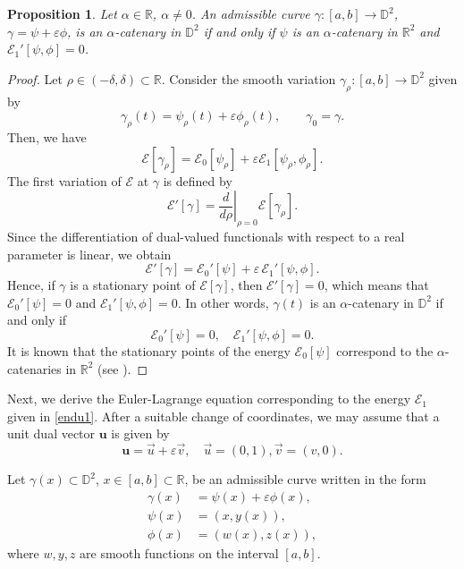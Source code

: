 \documentclass[a4paper,12pt]{amsart}
\newtheorem{proposition}[theorem]{Proposition}
\theoremstyle{definition}
\def\r{\mathbb R}
\def\d{\mathsf d}
\def\d{\mathbb D}
\begin{document}
\begin{proposition}\label{p21}
Let $\alpha\in \r$, $\alpha\neq0$. An admissible curve $\gamma:[a,b]\to\d^2$, $\gamma=\psi+\varepsilon \phi$, is an $\alpha$-catenary in $\d^2$ if and only if $ \psi$ is an $\alpha$-catenary in $\r^2$ and $\mathcal{E}_1'[\psi,\phi]=0$.
\end{proposition}
\begin{proof}
Let $\rho \in (-\delta,\delta)\subset \r$. Consider the smooth variation $\gamma_\rho:[a,b]\to \d^2$ given by
$$
\gamma_\rho(t)=\psi_\rho(t)+\varepsilon \phi_\rho(t), \qquad \gamma_0=\gamma.
$$
Then, we have
$$
\mathcal{E}[\gamma_\rho]
=\mathcal{E}_0[\psi_\rho]+\varepsilon \mathcal{E}_1[\psi_\rho,\phi_\rho].
$$
The first variation of $\mathcal{E}$ at $\gamma$ is defined by
$$
\mathcal{E}'[\gamma]=\left.\frac{d}{d\rho}\right|_{\rho=0}\mathcal{E}[\gamma_\rho].
$$
Since the differentiation of dual-valued functionals with respect to a real parameter is linear, we obtain
\begin{equation}\label{eq:firstvar-split}
\mathcal{E}'[\gamma]
=\mathcal{E}_0'[\psi]+\varepsilon\,\mathcal{E}_1'[\psi,\phi].
\end{equation}
Hence, if $\gamma$ is a stationary point of $\mathcal{E}[\gamma]$, then $\mathcal{E}'[\gamma]=0$, which means that $\mathcal{E}_0'[\psi]=0$ and $\mathcal{E}_1'[\psi,\phi]=0$. In other words, $\gamma(t)$ is an $\alpha$-catenary in $\d^2$ if and only if
\begin{equation}\label{eqsplit}
\mathcal{E}_0'[\psi]=0, \quad
\mathcal{E}_1'[\psi,\phi]=0.
\end{equation}
It is known that the stationary points of the energy $\mathcal{E}_0[\psi]$ correspond to the $\alpha$-catenaries in $\r^2$ (see \cite{die}). 
 
\end{proof}

Next, we derive the Euler-Lagrange equation corresponding to the energy $\mathcal{E}_1$ given in \eqref{endu1}. After a suitable change of coordinates, we may assume that a unit dual vector $\mathbf{u}$ is given by
$$\mathbf{u}=\vec{u}+\varepsilon \vec{v},\quad \vec{u}=(0,1), \vec{v}=(v,0).$$


Let $\gamma(x)\subset \d^2$, $x\in [a,b]\subset\r$, be an admissible curve written in the form 
\begin{equation}\label{g}
\begin{split}
\gamma(x)&=\psi(x)+\varepsilon \phi(x),\\
\psi(x)&=(x,y(x)),\\
\phi(x)&=(w(x),z(x)),
\end{split}
\end{equation}
where $w,y,z$ are smooth functions on the interval $[a,b]$. 
\end{document}
